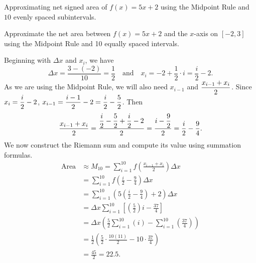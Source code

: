 \begin{marginfigure}[7cm] %
\caption{Approximating net signed area of $f(x)=5x+2$ using the Midpoint Rule and $10$ evenly spaced subintervals.} \label{fig:apex_5-3_Area2M}
\end{marginfigure}

\begin{example}\label{eg:NetAreaM10} %
Approximate the net area between $f(x)= 5x+2$ and the $x$-axis on $[-2,3]$ using the Midpoint Rule and 10 equally spaced intervals.

\solution Beginning with $\Delta x$ and $x_i$, we have
\[ \Delta x = \frac{3 - (-2)}{10} = \frac{1}{2} \quad \text{and} \quad x_i = -2 + \frac{1}{2} \cdot i = \frac{i}{2} - 2.\]
As we are using the Midpoint Rule, we will also need $x_{i-1}$ and $\displaystyle \frac{x_{i-1}+x_i}{2}$. Since $\displaystyle x_i = \frac{i}{2} - 2$,  $\displaystyle x_{i-1} =\frac{i-1}{2} - 2 = \frac{i}{2} - \frac{5}{2}$.
Then 
\[ \frac{x_{i-1}+x_i}{2} = \frac{\displaystyle\frac{i}{2} - \frac{5}{2} +\frac{i}{2} - 2}{2} = \frac{\displaystyle i-\frac{9}{2}}{2} = \frac{i}{2} - \frac{9}{4}.\]
We now construct the Riemann sum and compute its value using summation formulas.
\begin{align*}
\mbox{Area} & \approx M_{10} = \sum_{i=1}^{10} f\left( \frac{x_{i-1}+x_i}{2} \right) \Delta x \\
&=	\sum_{i=1}^{10} f \left( \frac{i}{2} - \frac{9}{4} \right) \Delta x \\
&=	\sum_{i=1}^{10} \left( 5 \left( \frac{i}{2} - \frac{9}{4} \right) + 2 \right) \Delta x \\
&=	\Delta x\sum_{i=1}^{10}\left[\left(\frac{5}{2}\right)i - \frac{37}{4}\right]\\
&=	\Delta x\left(\frac{5}2\sum_{i=1}^{10} (i) - \sum_{i=1}^{10}\left(\frac{37}{4}\right)\right) \\
&= \frac12\left(\frac52\cdot\frac{10(11)}{2} - 10\cdot\frac{37}4\right)  \\
&= \frac{45}2 = 22.5.
\end{align*}
\end{example}